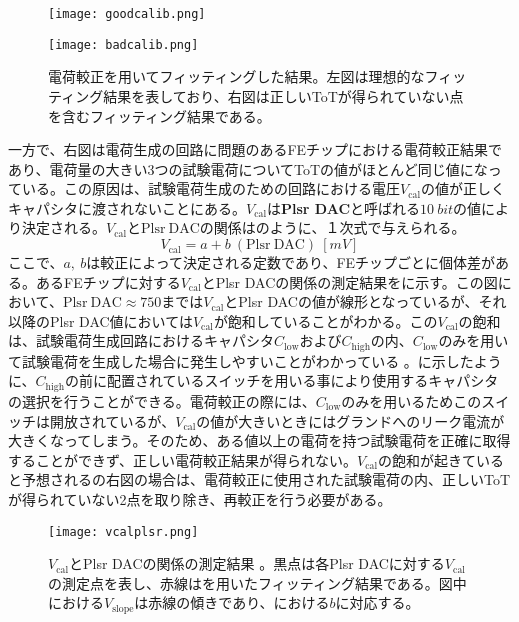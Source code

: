 \begin{figure}[tbp]
  \begin{minipage}[b]{0.5\linewidth}
    \centering
    \texttt{[image: goodcalib.png]}
  \end{minipage}
  \begin{minipage}[b]{0.5\linewidth}
    \centering
    \texttt{[image: badcalib.png]}
  \end{minipage}
  \caption[電荷較正を用いてフィッティングした結果]{電荷較正を用いてフィッティングした結果。左図は理想的なフィッティング結果を表しており、右図は正しいToTが得られていない点を含むフィッティング結果である。}
  \label{fig:calibhikaku}
\end{figure}

一方で、右図は電荷生成の回路に問題のあるFEチップにおける電荷較正結果であり、電荷量の大きい3つの試験電荷についてToTの値がほとんど同じ値になっている。この原因は、試験電荷生成のための回路における電圧$V_\mathrm{cal}$の値が正しくキャパシタに渡されないことにある。$V_\mathrm{cal}$は\textbf{Plsr DAC}と呼ばれる$10\ \si{bit}$の値により決定される。$V_\mathrm{cal}$と$\mathrm{Plsr\ DAC}$の関係はのように、１次式で与えられる。
\begin{equation}
  \label{eq:vcal}
  V_\mathrm{cal} = a + b\ (\mathrm{Plsr\ DAC})\ [\si{mV}]
\end{equation}
ここで、$a,\ b$は較正によって決定される定数であり、FEチップごとに個体差がある。あるFEチップに対する$V_\mathrm{cal}$とPlsr DACの関係の測定結果をに示す。この図において、$\mathrm{Plsr\ DAC}\approx 750$までは$V_\mathrm{cal}$とPlsr DACの値が線形となっているが、それ以降のPlsr DAC値においては$V_\mathrm{cal}$が飽和していることがわかる。この$V_\mathrm{cal}$の飽和は、試験電荷生成回路におけるキャパシタ$C_\mathrm{low}$および$C_\mathrm{high}$の内、$C_\mathrm{low}$のみを用いて試験電荷を生成した場合に発生しやすいことがわかっている \cite{houwa}。に示したように、$C_\mathrm{high}$の前に配置されているスイッチを用いる事により使用するキャパシタの選択を行うことができる。電荷較正の際には、$C_\mathrm{low}$のみを用いるためこのスイッチは開放されているが、$V_\mathrm{cal}$の値が大きいときにはグランドへのリーク電流が大きくなってしまう。そのため、ある値以上の電荷を持つ試験電荷を正確に取得することができず、正しい電荷較正結果が得られない。$V_\mathrm{cal}$の飽和が起きていると予想されるの右図の場合は、電荷較正に使用された試験電荷の内、正しいToTが得られていない2点を取り除き、再較正を行う必要がある。
\begin{figure}[tbp]
  \centering
  \texttt{[image: vcalplsr.png]}
  \caption[$V_\mathrm{cal}$とPlsr DACの関係の測定結果]{$V_\mathrm{cal}$とPlsr DACの関係の測定結果 \cite{vcal}。黒点は各Plsr DACに対する$V_\mathrm{cal}$の測定点を表し、赤線はを用いたフィッティング結果である。図中における$V_\mathrm{slope}$は赤線の傾きであり、における$b$に対応する。}
  \label{fig:vcalplot}
\end{figure}


